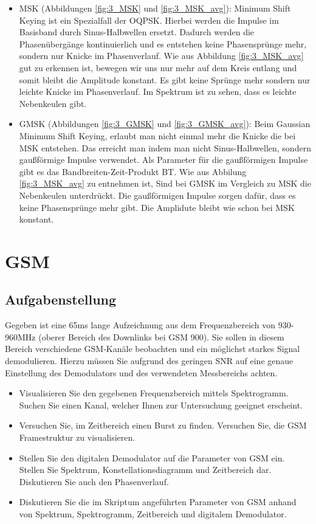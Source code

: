 \documentclass[12pt,a4paper,ngerman]{article}
\begin{document}
\begin{itemize}
\item MSK (Abbildungen \ref{fig:3_MSK} und \ref{fig:3_MSK_avg}): Minimum Shift Keying ist ein Spezialfall der OQPSK. Hierbei werden die Impulse im Basisband durch Sinus-Halbwellen ersetzt. Dadurch werden die Phasenübergänge kontinuierlich und es entstehen keine Phasensprünge mehr, sondern nur Knicke im Phasenverlauf. Wie aus Abbildung \ref{fig:3_MSK_avg} gut zu erkennen ist, bewegen wir uns nur mehr auf dem Kreis entlang und somit bleibt die Amplitude konstant. Es gibt keine Sprünge mehr sondern nur leichte Knicke im Phasenverlauf. Im Spektrum ist zu sehen, dass es leichte Nebenkeulen gibt.
\item GMSK (Abbildungen \ref{fig:3_GMSK} und \ref{fig:3_GMSK_avg}): Beim Gaussian Minimum Shift Keying, erlaubt man nicht einmal mehr die Knicke die bei MSK entstehen. Das erreicht man indem man nicht Sinus-Halbwellen, sondern gaußförmige Impulse verwendet. Als Parameter für die gaußförmigen Impulse gibt es das Bandbreiten-Zeit-Produkt BT. Wie aus Abbilung \ref{fig:3_MSK_avg} zu entnehmen ist, Sind bei GMSK im Vergleich zu MSK die Nebenkeulen unterdrückt. Die gaußförmigen Impulse sorgen dafür, dass es keine Phasensprünge mehr gibt.
Die Amplidute bleibt wie schon bei MSK konstant.
\end{itemize}


\pagebreak



\section{GSM}
\subsection{Aufgabenstellung}
Gegeben ist eine 65ms lange Aufzeichnung aus dem Frequenzbereich von 930-960MHz (oberer Bereich des Downlinks bei GSM 900). Sie sollen in diesem Bereich verschiedene GSM-Kanäle beobachten und ein möglichst starkes Signal demodulieren. Hierzu müssen Sie aufgrund des geringen SNR auf eine genaue Einstellung des Demodulators und des verwendeten Messbereichs achten. 
\begin{itemize}
\item Visualisieren Sie den gegebenen Frequenzbereich mittels Spektrogramm. Suchen Sie einen Kanal, welcher Ihnen zur Untersuchung geeignet erscheint.
\item Versuchen Sie, im Zeitbereich einen Burst zu finden. Versuchen Sie, die GSM Framestruktur zu visualisieren.
\item Stellen Sie den digitalen Demodulator auf die Parameter von GSM ein. Stellen Sie Spektrum, Konstellationsdiagramm und Zeitbereich dar. Diskutieren Sie auch den Phasenverlauf. 
\item Diskutieren Sie die im Skriptum angeführten Parameter von GSM anhand von Spektrum, Spektrogramm, Zeitbereich und digitalem Demodulator. 
\end{itemize}
\cite[19]{skript}
\end{document}
